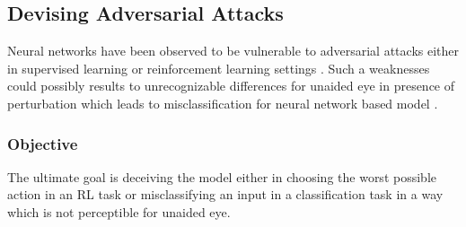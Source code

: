 \documentclass[a4paper,12pt]{article}
\begin{document}
\subsection{Devising Adversarial Attacks}
Neural networks have been observed to be vulnerable to adversarial attacks either in supervised learning or reinforcement learning settings \cite{Huang2017}. Such a weaknesses could possibly results to unrecognizable differences for unaided eye in presence of perturbation which leads to misclassification for neural network based model \cite{Szegedy2014, Goodfellow2014}. 

\subsubsection{Objective}
The ultimate goal is deceiving the model either in choosing the worst possible action in an RL task or misclassifying an input in a classification task in a way which is not perceptible for unaided eye.








\end{document}
